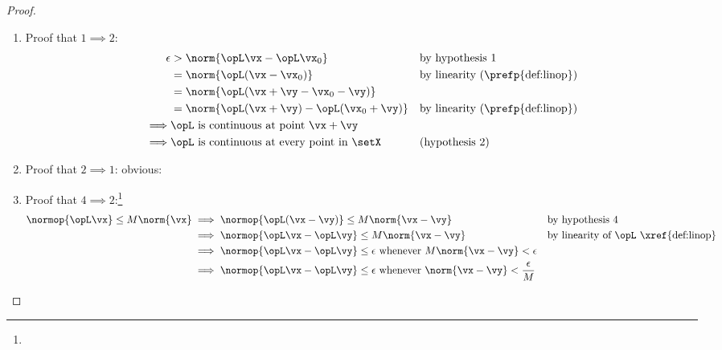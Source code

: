 \begin{proof}
\begin{enumerate}
  \item Proof that $1\implies2$:
    \begin{align*}
      \epsilon &> \norm{\opL\vx - \opL\vx_0}
        && \text{by hypothesis 1}
      \\&= \norm{\opL(\vx - \vx_0)}
        && \text{by linearity (\prefp{def:linop})}
      \\&= \norm{\opL(\vx +\vy - \vx_0-\vy)}
      \\&= \norm{\opL(\vx +\vy) - \opL(\vx_0+\vy)}
        && \text{by linearity (\prefp{def:linop})}
      \\\implies&\text{$\opL$ is continuous at point $\vx+\vy$}
      \\\implies&\text{$\opL$ is continuous at every point in $\setX$}
        && \text{(hypothesis 2)}
    \end{align*}
  \item Proof that $2\implies1$: obvious:
  \item Proof that $4\implies2$:\footnote{}
    \begin{align*}
      \normop{\opL\vx} \le M\norm{\vx}
        &\implies \normop{\opL(\vx-\vy)} \le M\norm{\vx-\vy}
        && \text{by hypothesis 4}
      \\&\implies \normop{\opL\vx-\opL\vy} \le M\norm{\vx-\vy}
        &&        \text{by linearity of $\opL$ \xref{def:linop}}
      \\&\implies \normop{\opL\vx-\opL\vy}\le\epsilon \text{ whenever } M\norm{\vx-\vy}<\epsilon
      \\&\implies \normop{\opL\vx-\opL\vy}\le\epsilon \text{ whenever } \norm{\vx-\vy}<\frac{\epsilon}{M}

\end{align*}
\end{enumerate}
\end{proof}
